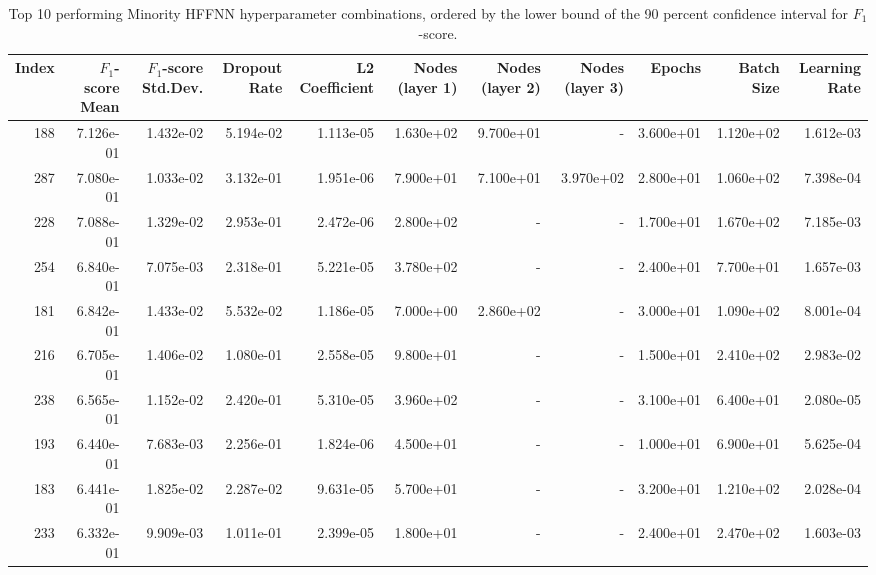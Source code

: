 \begin{table}
\caption{Top 10 performing Minority HFFNN hyperparameter combinations, ordered by the lower bound of the 90 percent confidence interval for $F_1$-score.}
\label{tab:05_best_minority_hffnn_hpars}
\begin{tabular}{rrrrrrrrrrr}
\toprule
Index & $F_1$-score Mean & $F_1$-score Std.Dev. & Dropout Rate & L2 Coefficient & Nodes (layer 1) & Nodes (layer 2) & Nodes (layer 3) & Epochs & Batch Size & Learning Rate \\
\midrule
188 & 7.126e-01 & 1.432e-02 & 5.194e-02 & 1.113e-05 & 1.630e+02 & 9.700e+01 & - & 3.600e+01 & 1.120e+02 & 1.612e-03 \\
287 & 7.080e-01 & 1.033e-02 & 3.132e-01 & 1.951e-06 & 7.900e+01 & 7.100e+01 & 3.970e+02 & 2.800e+01 & 1.060e+02 & 7.398e-04 \\
228 & 7.088e-01 & 1.329e-02 & 2.953e-01 & 2.472e-06 & 2.800e+02 & - & - & 1.700e+01 & 1.670e+02 & 7.185e-03 \\
254 & 6.840e-01 & 7.075e-03 & 2.318e-01 & 5.221e-05 & 3.780e+02 & - & - & 2.400e+01 & 7.700e+01 & 1.657e-03 \\
181 & 6.842e-01 & 1.433e-02 & 5.532e-02 & 1.186e-05 & 7.000e+00 & 2.860e+02 & - & 3.000e+01 & 1.090e+02 & 8.001e-04 \\
216 & 6.705e-01 & 1.406e-02 & 1.080e-01 & 2.558e-05 & 9.800e+01 & - & - & 1.500e+01 & 2.410e+02 & 2.983e-02 \\
238 & 6.565e-01 & 1.152e-02 & 2.420e-01 & 5.310e-05 & 3.960e+02 & - & - & 3.100e+01 & 6.400e+01 & 2.080e-05 \\
193 & 6.440e-01 & 7.683e-03 & 2.256e-01 & 1.824e-06 & 4.500e+01 & - & - & 1.000e+01 & 6.900e+01 & 5.625e-04 \\
183 & 6.441e-01 & 1.825e-02 & 2.287e-02 & 9.631e-05 & 5.700e+01 & - & - & 3.200e+01 & 1.210e+02 & 2.028e-04 \\
233 & 6.332e-01 & 9.909e-03 & 1.011e-01 & 2.399e-05 & 1.800e+01 & - & - & 2.400e+01 & 2.470e+02 & 1.603e-03 \\
\bottomrule
\end{tabular}
\end{table}
